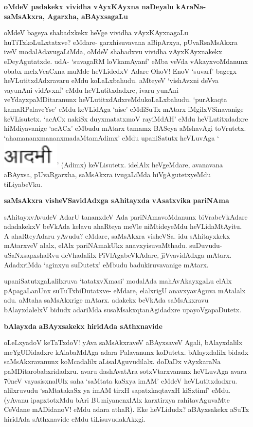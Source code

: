 {\bigskip
\noindent
{\large\bf oMdeV padakekx vividha vAyxKAyxna naDeyalu kAraNa- saMsAkxra, Agarxha, aBAyxsagaLu}}\label{page212a}
\medskip

\noindent
oMdeV bageya shabadxkekx heVge vividha vAyxKAyxnagaLu huTiTxkoLuLxtatxve? eMdare- garxhisuvavana aBipArxya, pUvaRsaMsAkxra iveV modalAdavugaLiMda, oMdeV shabadxvu vividha vAyxKAyxnakekx eDeyAgutatxde. udA- `suvagaRM loVkamAyanf' eMba veVda vAkayxvoMdanunx obabx melxVcaCxna muMde heVLidedxV Adare OhoV! EnoV `suvarf' bagegx heVLutitxdAdxravaru eMdu koLaLxbahudu. aMteyeV `vishAvxni deVva vayunAni vidAvxnf' eMdu heVLutitxdadxre, ivaru yunAni veYdayxpaMDitaranunx heVLutitxdAdxreMdukoLaLxbahudu. `purAkaqta kamaRPalaveYse' eMdu keVLidAga `aise' eMdiSuTx mAtarx iMgilxVSinavanige keVLisutetx. `acACx nakiSx duyxmatatxmoV rayiMdAH'\label{213a} eMdu heVLutitxdadxre hiMdiyavanige `acACx' eMbudu mAtarx tamamx BASeya aMshavAgi toVrutetx. `ahamananxmananxmadaMtamAdimx' eMdu upaniSatutx heVLuvAga `{\includegraphics[scale=.6]{fig2.eps}}' (Adimx) keVLisutetx. idelAlx heVgeMdare, avanavana aBAyxsa, pUvaRgarxha, saMsAkxra ivugaLiMda hiVgAgutetxyeMdu tiLiyabeVku.

{\bigskip
\noindent
{\large\bf saMsAkxra visheVSavidAdxga sAhitayxda vAsatxvika pariNAma}}\label{page213}
\medskip

\noindent
sAhitayxvAvudeV AdarU tananxdeV Ada pariNAmavoMdanunx biVrabeVkAdare adadakekxV beVkAda kelavu ahaRteya meVle niMtideyeMdu heVLidaMtAyitu. A ahaRteyAdaru yAvudu? eMdare, saMsAkxra visheVSa. idu sAhitayxkekx mAtarxveV alalx, elAlx pariNAmakUkx anavxyisuvaMthadu. suDuvudu- uSaNxsapxshaRvu deVhadalilx PiVlAgabeVkAdare, jiVvavidAdxga mAtarx. AdadxriMda `aginxyu suDutetx' eMbudu badukiruvavanige mAtarx.

upaniSatutxgaLalilxruva `tatatxvXmasi' modalAda mahAvAkayxgaLu elAlx pApagaLanUnx suTuTxbiDutatxve- eMdare, elalxrigU anavxyavAguva mAtalalx adu. \hbox{aMtaha} saMsAkxrige mAtarx. adakekx beVkAda saMsAkxravu bAlayxdalelxV bidudx adariMda susaMsakxqtanAgidadxre upayoVgapaDutetx.

{\bigskip
\noindent
{\large\bf bAlayxda aBAyxsakekx hiridAda sAthxnavide}}\label{page213a}
\medskip

\noindent
oLeLxyadoV keTaTxdoV! yAva saMsAkxraveV aBAyxsaveV Agali, bAlayxdalilx meYgUDidadxre kAlabaMdAga adara Palavanunx koDutetx. bAlayxdalilx bidadx saMsAkxravanunx koMcadalilx aLisalAguvudilalx. doDaDx vAyxkaraNa paMDitarobabxridadxru. avaru dashAvatAra sotxVtarxvanunx heVLuvAga avara 70neV vayasisxnalUlx saha `saMtata kaSxya imAM' eMdeV heVLutitxdadxru. alilxruvudu `saMtatakaSx ya imAM\label{213} tirxH sapatxkaqtavxH kiSxtimf' eMdu. (yAvanu ipapxtotxMdu bAri BUmiyanenxlAlx karxtirxya rahitavAguvaMte CeVdane mADidanoV! eMdu adara athaR). Eke heVLidudx? aBAyxsakekx aSuTx hiridAda sAthxnavide eMdu tiLisuvudakAkxgi.


